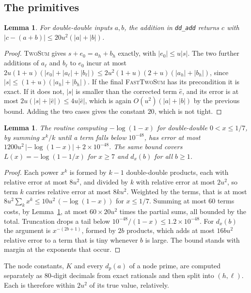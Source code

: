 \documentclass[11pt]{amsart}
\newtheorem{lemma}[theorem]{Lemma}
\theoremstyle{remark}
\begin{document}
\subsection{The primitives}
\begin{lemma}\label{lem:ddadd}
For double-double inputs $a, b$, the addition in \texttt{dd\_add} returns $c$
with $|c - (a + b)| \le 20u^{2}(|a| + |b|)$.
\end{lemma}
\begin{proof}
\textsc{TwoSum} gives $s + e_0 = a_h + b_h$ exactly, with $|e_0| \le u|s|$. The
two further additions of $a_\ell$ and $b_\ell$ to $e_0$ incur at most
$2u(1+u)(|e_0| + |a_\ell| + |b_\ell|) \le 2u^{2}(1+u)(2+u)(|a_h| + |b_h|)$, since
$|s| \le (1+u)(|a_h| + |b_h|)$. If the final \textsc{FastTwoSum} has its
precondition it is exact. If it does not, $|s|$ is smaller than the corrected
term $\hat e$, and its error is at most $2u(|s| + |\hat e|) \le 4u|\hat e|$,
which is again $O(u^{2})(|a| + |b|)$ by the previous bound. Adding the two cases
gives the constant $20$, which is not tight.
\end{proof}

\begin{lemma}\label{lem:ddseries}
The routine computing $-\log(1 - x)$ for double-double $0 < x \le 1/7$, by summing
$x^{k}/k$ until a term falls below $10^{-48}$, has error at most
$1200u^{2}\,|{-\log(1-x)}| + 2 \times 10^{-48}$. The same bound covers
$L(x) = -\log(1 - 1/x)$ for $x \ge 7$ and $d_x(b)$ for all $b \ge 1$.
\end{lemma}
\begin{proof}
Each power $x^{k}$ is formed by $k - 1$ double-double products, each with relative
error at most $8u^{2}$, and divided by $k$ with relative error at most $2u^{2}$,
so term $k$ carries relative error at most $8ku^{2}$. Weighted by the terms, that
is at most $8u^{2} \sum_{k} x^{k} \le 10u^{2}\,(-\log(1-x))$ for $x \le 1/7$.
Summing at most $60$ terms costs, by Lemma~\ref{lem:ddadd}, at most
$60 \times 20u^{2}$ times the partial sums, all bounded by the total. Truncation
drops a tail below $10^{-48}/(1-x) \le 1.2 \times 10^{-48}$. For $d_x(b)$ the
argument is $x^{-(2b+1)}$, formed by $2b$ products, which adds at most $16bu^{2}$
relative error to a term that is tiny whenever $b$ is large. The bound stands
with margin at the exponents that occur.
\end{proof}

The node constants, $K$ and every $d_p(a)$ of a node prime, are computed
separately as $80$-digit decimals from exact rationals and then split into
$(h, \ell)$. Each is therefore within $2u^{2}$ of its true value, relatively.
\end{document}
